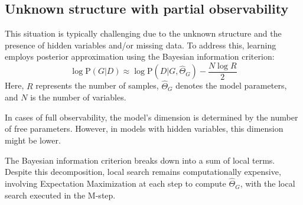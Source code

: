 \subsection{Unknown structure with partial observability}
This situation is typically challenging due to the unknown structure and the presence of hidden variables and/or missing data. 
To address this, learning employs posterior approximation using the Bayesian information criterion:
\[\log\text{P}(G|D) \approx \log\text{P}(D|G,\widehat{\Theta}_G)-\dfrac{N\log R}{2}\]
Here, $R$ represents the number of samples, $\widehat{\Theta}_G$ denotes the model parameters, and $N$ is the number of variables.

In cases of full observability, the model's dimension is determined by the number of free parameters.
However, in models with hidden variables, this dimension might be lower.

The Bayesian information criterion breaks down into a sum of local terms.
Despite this decomposition, local search remains computationally expensive, involving Expectation Maximization at each step to compute $\widehat{\Theta}_G$, with the local search executed in the M-step.